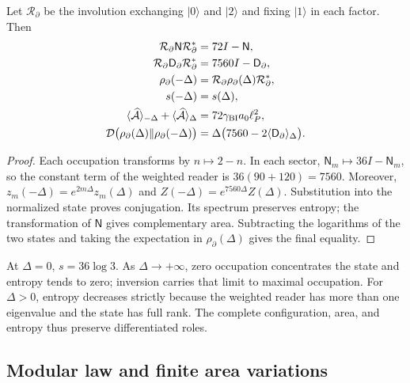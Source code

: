 \begin{theorem}
\label{vii:vii:thm:inversion-sectorial}
Let \(\mathcal R_\partial\) be the involution exchanging
\(|0\rangle\) and \(|2\rangle\) and fixing \(|1\rangle\) in each
factor. Then
\begin{align}
 \mathcal R_\partial\mathsf N\mathcal R_\partial^*&=72I-\mathsf N,\\
 \mathcal R_\partial\mathsf D_\partial\mathcal R_\partial^*
 &=7560I-\mathsf D_\partial,\\
 \rho_\partial(-\Delta)&=\mathcal R_\partial\rho_\partial(\Delta)
                          \mathcal R_\partial^*,\\
 s(-\Delta)&=s(\Delta),\\
 \langle\widehat{\mathcal A}\rangle_{-\Delta}
 +\langle\widehat{\mathcal A}\rangle_\Delta
 &=72\gamma_{\rm BI}a_0\ell_P^2,\\
 \mathcal D\bigl(\rho_\partial(\Delta)\Vert\rho_\partial(-\Delta)\bigr)
 &=\Delta\bigl(7560-2\langle\mathsf D_\partial\rangle_\Delta\bigr).
 \label{vii:vii:eq:inversion-sectorial}
\end{align}
\end{theorem}
\begin{proof}
Each occupation transforms by \(n\mapsto2-n\). In each sector,
\(\mathsf N_m\mapsto36I-\mathsf N_m\), so the constant
term of the weighted reader is \(36(90+120)=7560\).
Moreover, \(z_m(-\Delta)=e^{2m\Delta}z_m(\Delta)\) and
\(Z(-\Delta)=e^{7560\Delta}Z(\Delta)\). Substitution into the
normalized state proves conjugation. Its spectrum preserves entropy;
the transformation of \(\mathsf N\) gives complementary area. Subtracting
the logarithms of the two states and taking the expectation in
\(\rho_\partial(\Delta)\) gives the final equality.
\end{proof}

At \(\Delta=0\), \(s=36\log3\). As \(\Delta\to+\infty\),
zero occupation concentrates the state and entropy tends to zero;
inversion carries that limit to maximal occupation. For \(\Delta>0\),
entropy decreases strictly because the weighted reader has more
than one eigenvalue and the state has full rank. The complete configuration,
area, and entropy thus preserve differentiated roles.

\subsection{Modular law and finite area variations}
\label{vii:vii:subsec:ley-modular-finita}

